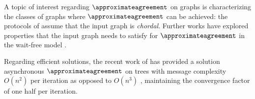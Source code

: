 A topic of interest regarding $\approximateagreement$ on graphs is characterizing the classes of graphs where $\approximateagreement$ can be achieved: the protocols of \cite{DISC:NoRy19,eprint:ConvexWorld} assume that the input graph is \emph{chordal}. Further works have explored properties that the input graph needs to satisfy for $\approximateagreement$ in the wait-free model \cite{SIROCCO:Alistarh21, OPODIS:Liu23}.

Regarding efficient solutions, the recent work of \cite{MoseArxivNew} has provided a solution asynchronous $\approximateagreement$ on trees with message complexity $O(n^2)$ per iteration as opposed to $O(n^3)$ \cite{DISC:NoRy19}, maintaining the convergence factor of one half per iteration.
